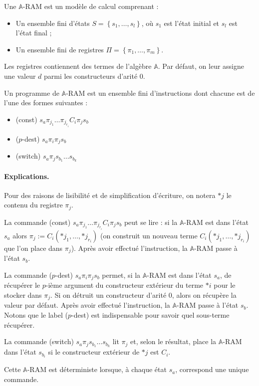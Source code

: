 \documentclass{report}
\newcommand{\bbA}{\mathbb{A}}
\begin{document}
		\begin{definition}
			\label{def:A_RAM}
			Une $\bbA$-RAM est un modèle de calcul comprenant :
			
			\begin{itemize}[itemsep=-1mm]
				\item 	Un ensemble fini d'états $S = \left\lbrace s_1, \dots, s_l \right\rbrace$, où $s_1$ est l'état initial et $s_l$ est l'état final ;
				\item 	Un ensemble fini de registres $\Pi = \left\lbrace \pi_1, \dots, \pi_m \right\rbrace$.
			\end{itemize}
			
			Les registres contiennent des termes de l'algèbre $\bbA$. Par défaut, on leur assigne une valeur $d$ parmi les constructeurs d'arité $0$. 
			
			Un programme de $\bbA$-RAM est un ensemble fini d'instructions dont chacune est de l'une des formes suivantes :
			
			\begin{itemize}[itemsep=-1mm]
				\item 	(const)			$s_a \pi_{j_1} \dots \pi_{j_{r_i}} C_i \pi_j s_b$
				\item	($p$-dest)		$s_a \pi_i \pi_j s_b$
				\item	(switch)		$s_a \pi_j s_{b_1} \dots s_{b_k}$
			\end{itemize}
			
			
			\paragraph{Explications.}
			Pour des raisons de lisibilité et de simplification d'écriture, on notera $*j$ le contenu du registre $\pi_j$. 
			
			La commande (const) $s_a \pi_{j_1} \dots \pi_{j_{r_i}} C_i \pi_j s_b$ peut se lire : si la $\bbA$-RAM est dans l'état $s_a$ alors $\pi_j := C_i\left( *j_1, \dots, *j_{r_i}\right)$ (on construit un nouveau terme $C_i\left( *j_1, \dots, *j_{r_i} \right)$ que l'on place dans $\pi_j$). Après avoir effectué l'instruction, la $\bbA$-RAM passe à l'état $s_b$.

			La commande ($p$-dest) $s_a \pi_i \pi_j s_b$ permet, si la $\bbA$-RAM est dans l'état $s_a$, de récupérer le $p$-ième argument du constructeur extérieur du terme $*i$ pour le stocker dans $\pi_j$. Si on détruit un constructeur d'arité $0$, alors on récupère la valeur par défaut. Après avoir effectué l'instruction, la $\bbA$-RAM passe à l'état $s_b$. Notons que le label ($p$-dest) est indispensable pour savoir quel sous-terme récupérer. 
			
			La commande (switch) $s_a \pi_j s_{b_1} \dots s_{b_k}$ lit $\pi_j$ et, selon le résultat, place la $\bbA$-RAM dans l'état $s_{b_i}$ si le constructeur extérieur de $*j$ est $C_i$.
			
			Cette $\bbA$-RAM est déterministe lorsque, à chaque état $s_a$, correspond une unique commande. 
		\end{definition}
		
\end{document}
